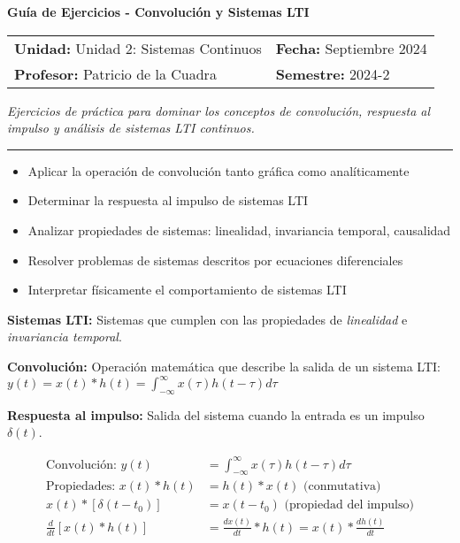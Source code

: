 \documentclass[11pt]{article}
\makeatletter
\newcommand{\configurarguia}[6]{
  \newcommand{\tituloGuia}{#1}
  \newcommand{\unidadGuia}{#2}
  \newcommand{\fechaGuia}{#3}
  \newcommand{\profesorGuia}{#4}
  \newcommand{\semestreGuia}{#5}
  \newcommand{\descripcionGuia}{#6}
}
\newcommand{\tituloGuiaPrincipal}{%
  \begin{center}
    {\LARGE\bfseries\tituloGuia}
    
    \vspace{0.4cm}
    
    \begin{tcolorbox}[
      colback=black!5,
      colframe=black,
      boxrule=1pt,
      rounded corners=8pt,
      center
    ]
      \begin{tabularx}{0.9\textwidth}{@{}X@{\hspace{1cm}}X@{}}
        \textbf{Unidad:} \unidadGuia & \textbf{Fecha:} \fechaGuia \\[0.2cm]
        \textbf{Profesor:} \profesorGuia & \textbf{Semestre:} \semestreGuia \\
      \end{tabularx}
      
      \vspace{0.3cm}
      
      \textit{\descripcionGuia}
    \end{tcolorbox}
    
    \vspace{0.3cm}
    
    \rule{\textwidth}{1.5pt}
  \end{center}
  
  \vspace{0.5cm}
}
\newenvironment{unidadconceptos}{%
  \begin{tcolorbox}[
    enhanced,
    colback=black!5,
    colframe=black,
    boxrule=1pt,
    rounded corners=8pt,
    title={\textbf{🔑 Conceptos Clave}},
    fonttitle=\bfseries
  ]
}{%
  \end{tcolorbox}
  \vspace{0.5cm}
}
\newenvironment{unidadformulas}{%
  \begin{tcolorbox}[
    enhanced,
    colback=black!5,
    colframe=black,
    boxrule=1pt,
    rounded corners=8pt,
    title={\textbf{📐 Fórmulas Importantes}},
    fonttitle=\bfseries
  ]
}{%
  \end{tcolorbox}
  \vspace{0.5cm}
}
\newcommand{\objetivos}[1]{%
  \begin{tcolorbox}[
    enhanced,
    colback=black!5,
    colframe=black,
    boxrule=1pt,
    rounded corners=8pt,
    title={\textbf{🎯 OBJETIVOS DE APRENDIZAJE}},
    fonttitle=\bfseries
  ]
  \begin{itemize}[leftmargin=20pt, itemsep=5pt]
    #1
  \end{itemize}
  \end{tcolorbox}
  \vspace{0.5cm}
}
\makeatother
\begin{document}
\configurarguia{
  Guía de Ejercicios - Convolución y Sistemas LTI  %
}{
  Unidad 2: Sistemas Continuos  %
}{
  Septiembre 2024  %
}{
  Patricio de la Cuadra  %
}{
  2024-2  %
}{
  Ejercicios de práctica para dominar los conceptos de convolución, respuesta al impulso y análisis de sistemas LTI continuos.  %
}

\tituloGuiaPrincipal

\objetivos{
  \item Aplicar la operación de convolución tanto gráfica como analíticamente
  \item Determinar la respuesta al impulso de sistemas LTI
  \item Analizar propiedades de sistemas: linealidad, invariancia temporal, causalidad
  \item Resolver problemas de sistemas descritos por ecuaciones diferenciales
  \item Interpretar físicamente el comportamiento de sistemas LTI
}

\begin{unidadconceptos}
  \textbf{Sistemas LTI:} Sistemas que cumplen con las propiedades de \textit{linealidad} e \textit{invariancia temporal}.
  
  \textbf{Convolución:} Operación matemática que describe la salida de un sistema LTI: $y(t) = x(t) * h(t) = \int_{-\infty}^{\infty} x(\tau)h(t-\tau)d\tau$
  
  \textbf{Respuesta al impulso:} Salida del sistema cuando la entrada es un impulso $\delta(t)$.
\end{unidadconceptos}

\begin{unidadformulas}
  \begin{align}
    \text{Convolución: } y(t) &= \int_{-\infty}^{\infty} x(\tau)h(t-\tau)d\tau \\
    \text{Propiedades: } x(t) * h(t) &= h(t) * x(t) \text{ (conmutativa)} \\
    x(t) * [\delta(t-t_0)] &= x(t-t_0) \text{ (propiedad del impulso)} \\
    \frac{d}{dt}[x(t) * h(t)] &= \frac{dx(t)}{dt} * h(t) = x(t) * \frac{dh(t)}{dt}
  \end{align}
\end{unidadformulas}
\end{document}
